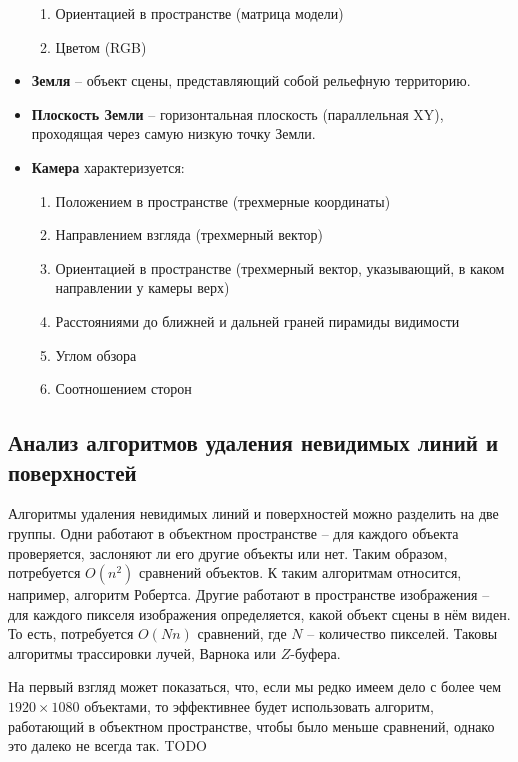 \begin{itemize}
\begin{enumerate}[label=(\alph*)]
            \item Ориентацией в пространстве (матрица модели)
            \item Цветом ({RGB})
        \end{enumerate}
    \item \textbf{Земля} -- {объект сцены}, представляющий собой рельефную территорию.
    \item \textbf{Плоскость Земли} -- горизонтальная плоскость (параллельная {XY}), проходящая через самую низкую точку {Земли}.
    \item \textbf{Камера} характеризуется:
        \begin{enumerate}[label=(\alph*)]
            \item Положением в пространстве (трехмерные координаты)
            \item Направлением взгляда (трехмерный вектор)
            \item Ориентацией в пространстве (трехмерный вектор, указывающий, в каком направлении у камеры верх)
            \item Расстояниями до ближней и дальней граней пирамиды видимости
            \item Углом обзора
            \item Соотношением сторон
        \end{enumerate}
\end{itemize}

\subsection{Анализ алгоритмов удаления невидимых линий и поверхностей}

Алгоритмы удаления невидимых линий и поверхностей можно разделить на две
группы. Одни работают в объектном пространстве -- для каждого объекта
проверяется, заслоняют ли его другие объекты или нет. Таким образом,
потребуется $O(n^2)$ сравнений объектов. К таким алгоритмам относится,
например, алгоритм Робертса. Другие работают в пространстве изображения -- для
каждого пикселя изображения определяется, какой объект сцены в нём виден. То
есть, потребуется $O(Nn)$ сравнений, где $N$ -- количество пикселей. Таковы
алгоритмы трассировки лучей, Варнока или $Z$-буфера.

На первый взгляд может показаться, что, если мы редко имеем дело с более чем
$1920 \times 1080$ объектами, то эффективнее будет использовать алгоритм,
работающий в объектном пространстве, чтобы было меньше сравнений, однако это
далеко не всегда так. TODO

